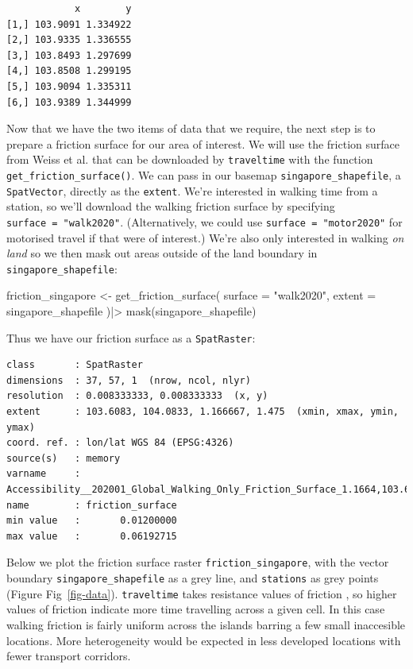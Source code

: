 \documentclass[
  10pt,
  letterpaper,
]{article}
\newenvironment{Shaded}{\begin{snugshade}}{\end{snugshade}}
\newcommand{\AttributeTok}[1]{\textcolor[rgb]{0.40,0.45,0.13}{#1}}
\newcommand{\FunctionTok}[1]{\textcolor[rgb]{0.28,0.35,0.67}{#1}}
\newcommand{\NormalTok}[1]{\textcolor[rgb]{0.00,0.23,0.31}{#1}}
\newcommand{\OtherTok}[1]{\textcolor[rgb]{0.00,0.23,0.31}{#1}}
\newcommand{\SpecialCharTok}[1]{\textcolor[rgb]{0.37,0.37,0.37}{#1}}
\newcommand{\StringTok}[1]{\textcolor[rgb]{0.13,0.47,0.30}{#1}}
\begin{document}
\begin{verbatim}
            x        y
[1,] 103.9091 1.334922
[2,] 103.9335 1.336555
[3,] 103.8493 1.297699
[4,] 103.8508 1.299195
[5,] 103.9094 1.335311
[6,] 103.9389 1.344999
\end{verbatim}

Now that we have the two items of data that we require, the next step is
to prepare a friction surface for our area of interest. We will use the
friction surface from Weiss et al. \citep{weiss2020global} that can be downloaded by
\texttt{traveltime} with the function \texttt{get\_friction\_surface()}.
We can pass in our basemap \texttt{singapore\_shapefile}, a
\texttt{SpatVector}, directly as the \texttt{extent}. We're interested
in walking time from a station, so we'll download the walking friction
surface by specifying \texttt{surface\ =\ "walk2020"}. (Alternatively,
we could use \texttt{surface\ =\ "motor2020"} for motorised travel if
that were of interest.) We're also only interested in walking \emph{on
land} so we then mask out areas outside of the land boundary in
\texttt{singapore\_shapefile}:

\begin{Shaded}
\begin{Highlighting}[]
\NormalTok{friction\_singapore }\OtherTok{\textless{}{-}} \FunctionTok{get\_friction\_surface}\NormalTok{(}
    \AttributeTok{surface =} \StringTok{"walk2020"}\NormalTok{,}
    \AttributeTok{extent =}\NormalTok{ singapore\_shapefile}
\NormalTok{  )}\SpecialCharTok{|\textgreater{}} 
  \FunctionTok{mask}\NormalTok{(singapore\_shapefile)}
\end{Highlighting}
\end{Shaded}

Thus we have our friction surface as a \texttt{SpatRaster}:

\begin{verbatim}
class       : SpatRaster 
dimensions  : 37, 57, 1  (nrow, ncol, nlyr)
resolution  : 0.008333333, 0.008333333  (x, y)
extent      : 103.6083, 104.0833, 1.166667, 1.475  (xmin, xmax, ymin, ymax)
coord. ref. : lon/lat WGS 84 (EPSG:4326) 
source(s)   : memory
varname     : Accessibility__202001_Global_Walking_Only_Friction_Surface_1.1664,103.6091,1.4714,104.0858 
name        : friction_surface 
min value   :       0.01200000 
max value   :       0.06192715 
\end{verbatim}

Below we plot the friction surface raster \texttt{friction\_singapore},
with the vector boundary \texttt{singapore\_shapefile} as a grey line,
and \texttt{stations} as grey points (Figure Fig~\ref{fig-data}).
\texttt{traveltime} takes resistance values of friction
\citep{gdistance2017}, so higher values of friction indicate more time
travelling across a given cell. In this case walking friction is fairly
uniform across the islands barring a few small inaccesible locations.
More heterogeneity would be expected in less developed locations with
fewer transport corridors.
\end{document}
